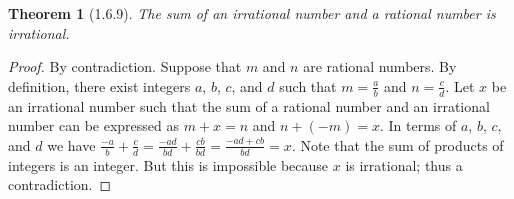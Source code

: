 \documentclass[a4paper, 12pt]{article}
\theoremstyle{plain}
\newtheorem*{theorem*}{Theorem}
\begin{document}
	
	\begin{theorem*}[1.6.9]
		The sum of an irrational number and a rational number is irrational.
	\end{theorem*}
	
	\begin{proof}
		By contradiction. Suppose that $m$ and $n$ are rational numbers. By definition, there exist integers $a$, $b$, $c$, and $d$ such that $m = \frac{a}{b}$ and $n = \frac{c}{d}$. Let $x$ be an irrational number such that the sum of a rational number and an irrational number can be expressed as $m + x = n$ and $n + (-m) = x$. In terms of $a$, $b$, $c$, and $d$ we have $\frac{-a}{b} + \frac{c}{d} = \frac{-ad}{bd} + \frac{cb}{bd} = \frac{-ad + cb}{bd} = x$. Note that the sum of products of integers is an integer. But this is impossible because $x$ is irrational; thus a contradiction.
	\end{proof}
\end{document}
